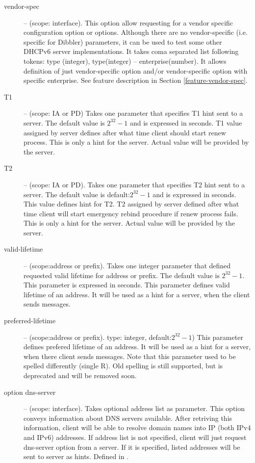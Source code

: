 \begin{description}
 \item[vendor-spec] -- (scope: interface). This option allow
   requesting for a vendor specific configuration option or
   options. Although there are no vendor-specific (i.e. specific for
   Dibbler) parameters, it can be used to test some other DHCPv6
   server implementations. It takes coma separated list following
   tokens: type (integer), type(integer) -- enterprise(number). It
   allows definition of just vendor-specific option and/or
   vendor-specific option with specific enterprise. See feature
   description in Section \ref{feature-vendor-spec}.

 \item[T1] -- (scope: IA or PD) Takes one parameter that specifies T1
   hint sent to a server. The default value is $2^{32}-1$ and is
   expressed in seconds. T1 value assigned by server defines after
   what time client should start renew process. This is only a hint
   for the server. Actual value will be provided by the server.

\item[T2] -- (scope: IA or PD). Takes one parameter that specifies T2 hint
   sent to a server. The default value is default:$2^{32}-1$ and is
   expressed in seconds. This value defines hint for T2. T2 assigned
   by server defined after what time client will start emergency
   rebind procedure if renew process fails. This is only a hint for
   the server. Actual value will be provided by the server.

\item[valid-lifetime] -- (scope:address or prefix). Takes one integer
   parameter that defined requested valid lifetime for address or
   prefix. The default value is $2^{32}-1$. This parameter is
   expressed in seconds. This parameter defines valid lifetime of an
   address. It will be used as a hint for a server, when the client
   sends  messages.

\item[preferred-lifetime] -- (scope:address or prefix).
   type: integer, default:$2^{32}-1$) This parameter defines prefered
   lifetime of an address. It will be used as a hint for a server,
   when there client sends  messages. Note that this
  parameter used to be spelled differently (single R). Old spelling
  is still supported, but is deprecated and will be removed soon.

 \item[option dns-server] -- (scope: interface). Takes optional
   address list as parameter. This option conveys information about
   DNS servers available. After retriving this information, client
   will be able to resolve domain names into IP (both IPv4 and IPv6)
   addresses. If address list is not specified, client will just
   request dns-server option from a server. If it is specified, listed
   addresses will be sent to server as hints. Defined in \cite{rfc3596}.


\end{description}
